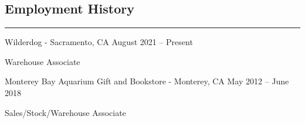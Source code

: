\documentclass[letterpaper, 10 pt]{article}
\begin{document}
\subsection*{Employment History}
\noindent\rule[0.75ex]{\linewidth}{0.55 pt}

\noindent
\centerline{Wilderdog - Sacramento, CA \hfill August 2021 – Present}

Warehouse Associate \\
\centerline{Monterey Bay Aquarium Gift and Bookstore - Monterey, CA \hfill May 2012 – June 2018}

Sales/Stock/Warehouse Associate



\end{document}
